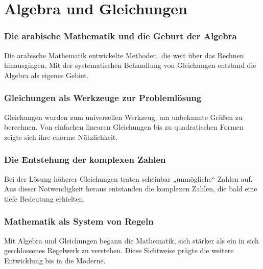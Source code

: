 
\chapter{Algebra und Gleichungen}
\label{chap:III_algebra}
\label{chap:III_qubit}
\setcounter{section}{3}
\setcounter{subsection}{0}
\setcounter{subsubsection}{1}
\setcounter{secnumdepth}{3}


\subsection{Die arabische Mathematik und die Geburt der Algebra}
Die arabische Mathematik entwickelte Methoden, die weit über das Rechnen hinausgingen. 
Mit der systematischen Behandlung von Gleichungen entstand die Algebra als eigenes Gebiet. 

\subsection{Gleichungen als Werkzeuge zur Problemlösung}
Gleichungen wurden zum universellen Werkzeug, um unbekannte Größen zu berechnen. 
Von einfachen linearen Gleichungen bis zu quadratischen Formen zeigte sich ihre enorme Nützlichkeit. 

\subsection{Die Entstehung der komplexen Zahlen}
Bei der Lösung höherer Gleichungen traten scheinbar „unmögliche“ Zahlen auf. 
Aus dieser Notwendigkeit heraus entstanden die komplexen Zahlen, die bald eine tiefe Bedeutung erhielten. 

\subsection{Mathematik als System von Regeln}
Mit Algebra und Gleichungen begann die Mathematik, sich stärker als ein in sich geschlossenes Regelwerk zu verstehen. 
Diese Sichtweise prägte die weitere Entwicklung bis in die Moderne. 
